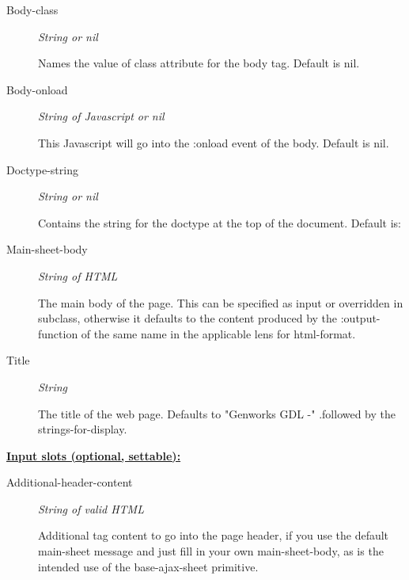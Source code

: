 \documentclass [11pt]{book}
\begin{document}
\begin{itemize}
\begin{description}

\item [Body-class]
\emph{String or nil}

 Names the value of class attribute for the body tag. Default is nil.




\item [Body-onload]
\emph{String of Javascript or nil}

 This Javascript will go into the :onload event of the body.
Default is nil.




\item [Doctype-string]
\emph{String or nil}

 Contains the string for the doctype at the top of the document. Default is:


\item [Main-sheet-body]
\emph{String of HTML}

 The main body of the page.
This can be specified as input or overridden in subclass, otherwise it defaults
to the content produced by the :output-function of the same name
in the applicable lens for  html-format.




\item [Title]
\emph{String}

 The title of the web page. Defaults to "Genworks GDL -"
.followed by the strings-for-display.




\end{description}






\textbf{
\underline{Input slots (optional, settable):}}

\begin{description}

\item [Additional-header-content]
\emph{String of valid HTML}

 Additional tag content to go into the page header,
if you use the default main-sheet message and just fill in your own main-sheet-body, as
is the intended use of the base-ajax-sheet primitive.





\end{description}
\end{itemize}
\end{document}
